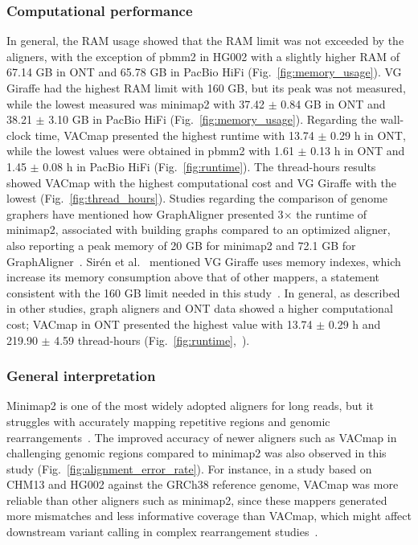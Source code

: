 \documentclass[12pt, letterpaper]{article}
\begin{document}
\subsubsection{Computational performance}
In general, the RAM usage showed that the RAM limit was not exceeded by the aligners, with the exception of pbmm2 in HG002 with a slightly higher RAM of 67.14 GB in ONT and 65.78 GB in PacBio HiFi (Fig.~\ref{fig:memory_usage}). VG Giraffe had the highest RAM limit with 160 GB, but its peak was not measured, while the lowest measured was minimap2 with 37.42 $\pm$ 0.84 GB in ONT and 38.21 $\pm$ 3.10 GB in PacBio HiFi (Fig.~\ref{fig:memory_usage}). Regarding the wall-clock time, VACmap presented the highest runtime with 13.74 $\pm$ 0.29 h in ONT, while the lowest values were obtained in pbmm2 with 1.61 $\pm$ 0.13 h in ONT and 1.45 $\pm$ 0.08 h in PacBio HiFi (Fig.~\ref{fig:runtime}). The thread-hours results showed VACmap with the highest computational cost and VG Giraffe with the lowest (Fig.~\ref{fig:thread_hours}). Studies regarding the comparison of genome graphers have mentioned how GraphAligner presented 3$\times$ the runtime of minimap2, associated with building graphs compared to an optimized aligner, also reporting a peak memory of 20 GB for minimap2 and 72.1 GB for GraphAligner~\cite{Rautiainen2020}. Sirén et al.~\cite{Sirén2021} mentioned VG Giraffe uses memory indexes, which increase its memory consumption above that of other mappers, a statement consistent with the 160 GB limit needed in this study~\cite{Chang2025}. In general, as described in other studies, graph aligners and ONT data showed a higher computational cost; VACmap in ONT presented the highest value with 13.74 $\pm$ 0.29 h and 219.90 $\pm$ 4.59 thread-hours (Fig.~\ref{fig:runtime},~).

\subsubsection{General interpretation}
Minimap2 is one of the most widely adopted aligners for long reads, but it struggles with accurately mapping repetitive regions and genomic rearrangements~\cite{Mahmoud2025,vacmap2025}. The improved accuracy of newer aligners such as VACmap in challenging genomic regions compared to minimap2 was also observed in this study (Fig.~\ref{fig:alignment_error_rate}). For instance, in a study based on CHM13 and HG002 against the GRCh38 reference genome, VACmap was more reliable than other aligners such as minimap2, since these mappers generated more mismatches and less informative coverage than VACmap, which might affect downstream variant calling in complex rearrangement studies~\cite{vacmap2025}.
\end{document}
